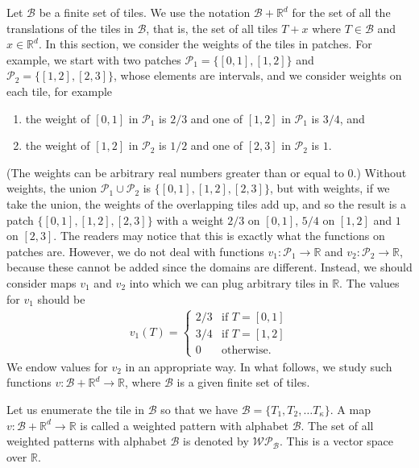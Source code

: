 \documentclass[a4]{amsart}
\newcommand{\WP}{\mathcal{W}\mathcal{P}}
\theoremstyle{definition}
\begin{document}
Let $\mathcal{B}$ be a finite set of tiles. We use the notation $\mathcal{B}+\mathbb{R}^d$ for the set of all
the translations of the tiles in $\mathcal{B}$, that is, the set of all tiles $T+x$ where
$T\in\mathcal{B}$ and $x\in\mathbb{R}^d$.
In this section, we consider
the weights of the tiles in patches. For example,
we start with two patches $\mathcal{P}_1=\{[0,1],[1,2]\}$
and $\mathcal{P}_2=\{[1,2],[2,3]\}$,  whose elements are intervals, and
we consider weights on each tile, for example
\begin{enumerate}
    \item the weight of $[0,1]$ in 
    $\mathcal{P}_1$ is $2/3$ and one of $[1,2]$
    in $\mathcal{P}_1$ is $3/4$, and
    \item the weight of $[1,2]$ in 
    $\mathcal{P}_2$ is $1/2$ and one of $[2,3]$
    in $\mathcal{P}_2$ is $1$.
\end{enumerate}
(The weights can be arbitrary real numbers greater than or equal to 0.)
Without weights, the union
$\mathcal{P}_1\cup\mathcal{P}_2$ is
$\{[0,1],[1,2],[2,3]\}$, but with weights,
if we take the union, the weights of the
overlapping tiles add up, and so the result is
a patch $\{[0,1],[1,2],[2,3]\}$ with a weight
$2/3$ on $[0,1]$, $5/4$ on $[1,2]$ and $1$ 
on $[2,3]$. The readers may notice that
this is exactly what the functions on
patches are. 
However, we do not deal with functions
$v_1\colon\mathcal{P}_1\rightarrow\mathbb{R}$
and
$v_2\colon\mathcal{P}_2\rightarrow\mathbb{R}$,
because these cannot be added since the
domains are different. 
Instead, we should consider maps
$v_1$ and $v_2$ into which we can plug
arbitrary tiles in $\mathbb{R}$.
The values for $v_1$ should be
\begin{align}
    v_1(T)=
    \begin{cases}
    2/3 &\text{if $T=[0,1]$}\\
    3/4 &\text{if $T=[1,2]$}\\
    0&\text{otherwise.}
    \end{cases}\label{def_example_for_wp_v1}
\end{align}
We endow values for $v_2$ in an appropriate way.
In what follows, we study such functions $v\colon\mathcal{B}+\mathbb{R}^d\rightarrow\mathbb{R}$, where $\mathcal{B}$ is a given finite
set of tiles.

Let us enumerate the tile in $\mathcal{B}$ so that
we have $\mathcal{B}=\{T_1,T_2,\ldots T_{\kappa}\}$.
A map $v\colon\mathcal{B}+\mathbb{R}^d\rightarrow\mathbb{R}$ is called a weighted pattern
with alphabet $\mathcal{B}$. 
The set of all weighted patterns with alphabet $\mathcal{B}$ is denoted by $\WP_{\mathcal{B}}$.
This is a vector space over $\mathbb{R}$.
\end{document}
